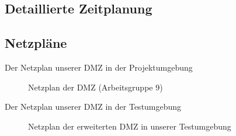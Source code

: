 

\clearpage

\subsection{Detaillierte Zeitplanung}
\label{app:Zeitplanung}
\clearpage



\clearpage

\subsection{Netzpläne}
\label{app:Netzplan}
Der Netzplan unserer \acs{DMZ} in der Projektumgebung
\begin{figure}[htb]
\centering
{}
\caption{Netzplan der DMZ (Arbeitsgruppe 9)}
\end{figure}
Der Netzplan unserer \acs{DMZ} in der Testumgebung
\begin{figure}[htb]
    \centering
    \caption{Netzplan der erweiterten DMZ in unserer Testumgebung}
\end{figure}
\clearpage


